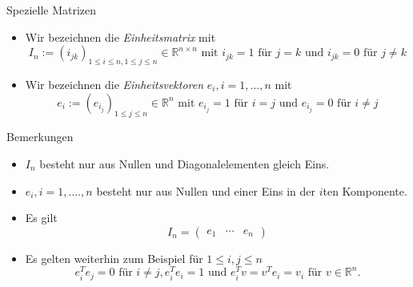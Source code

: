\documentclass[
  8pt,
  ignorenonframetext,
]{beamer}
\providecommand{\tightlist}{%
  \setlength{\itemsep}{0pt}\setlength{\parskip}{0pt}}
\begin{document}
\begin{frame}{Spezielle Matrizen}
\protect\hypertarget{spezielle-matrizen}{}
\footnotesize
\begin{definition}
\begin{itemize}
\item Wir bezeichnen die \textit{Einheitsmatrix} mit
\begin{equation}
I_{n} := (i_{jk})_{1 \le i \le n, 1 \le j \le n} \in \mathbb{R}^{n \times n} \mbox{ mit } i_{jk} = 1 \mbox{ für } j = k \mbox{ und } i_{jk} = 0 \mbox{ für } j \neq k
\end{equation}
\item Wir bezeichnen die \textit{Einheitsvektoren} $e_i, i = 1,...,n$ mit
\begin{equation}
e_{i} := (e_{{i}_j})_{1 \le j \le n} \in \mathbb{R}^{n} \mbox{ mit } e_{{i}_j} = 1 \mbox{ für } i = j \mbox{ und } e_{{i}_j} = 0 \mbox{ für } i \neq j
\end{equation}
\end{itemize}
\end{definition}

Bemerkungen

\begin{itemize}
\tightlist
\item
  \(I_n\) besteht nur aus Nullen und Diagonalelementen gleich Eins.
\item
  \(e_i, i = 1,....,n\) besteht nur aus Nullen und einer Eins in der
  \(i\)ten Komponente.
\item
  Es gilt \begin{equation}
  I_n = \begin{pmatrix} e_1 & \cdots & e_n \end{pmatrix}
  \end{equation}
\item
  Es gelten weiterhin zum Beispiel für \(1 \le i,j \le n\)
  \begin{equation}
  e^T_ie_j = 0 \mbox{ für } i \neq j,  e^T_ie_i = 1 \mbox{ und } e^T_iv = v^Te_i = v_i \mbox{ für } v \in \mathbb{R}^n.
  \end{equation}
\end{itemize}
\end{frame}
\end{document}
